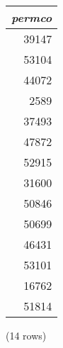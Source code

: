 \documentclass[]{article}
\newenvironment{question}[2][Question]{\begin{trivlist}
\item[\hskip \labelsep {\bfseries #1}\hskip \labelsep {\bfseries #2.}]}{\end{trivlist}}
\begin{document}
\begin{question}{1}
\begin{enumerate}[label=(\alph*)]
\begin{center}
\begin{tabular}{r}
\textit{permco} \\
\hline
39147 \\
53104 \\
44072 \\
2589 \\
37493 \\
47872 \\
52915 \\
31600 \\
50846 \\
50699 \\
46431 \\
53101 \\
16762 \\
51814 \\
\end{tabular}

\noindent (14 rows) \\
\end{center}

\end{enumerate}
\end{question}
\end{document}
